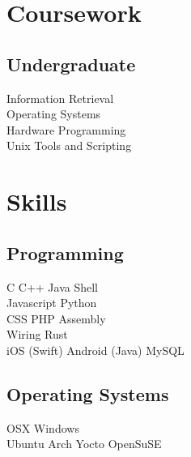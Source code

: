 \documentclass[]{deedy-resume-openfont}
\begin{document}
\begin{minipage}[t]{0.33\textwidth}
\section{Coursework}
\subsection{Undergraduate}
Information Retrieval \\
Operating Systems \\
Hardware Programming \\
Unix Tools and Scripting \\
\sectionsep


\section{Skills}
\subsection{Programming}
C \textbullet{}   C++ \textbullet{} Java \textbullet{} Shell \\
Javascript \textbullet{} Python \\ 
CSS \textbullet{} PHP \textbullet{} Assembly \\
Wiring \textbullet{} Rust \\
iOS (Swift) \textbullet{} Android (Java) \textbullet{} MySQL
\subsection{Operating Systems}
OSX \textbullet{} Windows \\
Ubuntu \textbullet{} Arch \textbullet{} Yocto \textbullet{} OpenSuSE
\sectionsep

%
%

\end{minipage} 
\hfill
\end{document}

